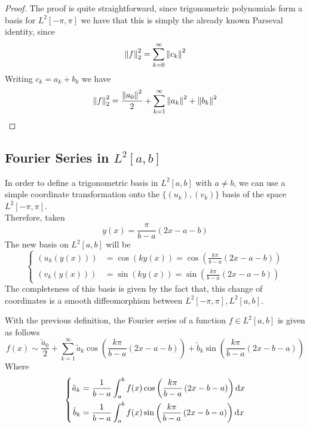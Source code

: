 \documentclass[../complete.tex]{subfiles}
\begin{document}
\begin{proof}
	The proof is quite straightforward, since trigonometric polynomials form a basis for $L^2[-\pi,\pi]$ we have that this is simply the already known Parseval identity, since
	\begin{equation*}
		\pnorm[2]{f}^2=\sum_{k=0}^{\infty}\norm{c_k}^2
	\end{equation*}
	Writing $c_k=a_k+b_k$ we have
	\begin{equation*}
		\pnorm[2]{f}^2=\frac{\norm{a_0}^2}{2}+\sum_{k=1}^{\infty}\norm{a_k}^2+\norm{b_k}^2
	\end{equation*}
\end{proof}
\subsection{Fourier Series in $L^2[a,b]$}
\begin{dfn}
	In order to define a trigonometric basis in $L^2[a,b]$ with $a\ne b$, we can use a simple coordinate transformation onto the $\{(u_k),(v_k)\}$ basis of the space $L^2[-\pi,\pi]$.\\
	Therefore, taken
	\begin{equation*}
		y(x)=\frac{\pi}{b-a}(2x-a-b)
	\end{equation*}
	The new basis on $L^2[a,b]$ will be
	\begin{equation*}
		\left\{ \begin{aligned}
				(u_k(y(x)))&=\cos(ky(x))=\cos\left(\frac{k\pi}{b-a}(2x-a-b)\right)\\
				(v_k(y(x)))&=\sin(ky(x))=\sin\left( \frac{k\pi}{b-a}\left( 2x-a-b \right) \right)
		\end{aligned}\right.
	\end{equation*}
	The completeness of this basis is given by the fact that, this change of coordinates is a smooth diffeomorphism between $L^2[-\pi,\pi],L^2[a,b]$.
\end{dfn}
\begin{dfn}
	With the previous definition, the Fourier series of a function $f\in L^2[a,b]$ is given as follows
	\begin{equation}
		f(x)\sim\frac{\tilde{a}_0}{2}+\sum_{k=1}^{\infty}\tilde{a}_k\cos\left( \frac{k\pi}{b-a}(2x-a-b) \right)+\tilde{b}_k\sin\left( \frac{k\pi}{b-a}(2x-b-a) \right)
		\label{eq:fouserab}
	\end{equation}
	Where
	\begin{equation}
		\left\{ \begin{aligned}
				\tilde{a}_k&=\frac{1}{b-a}\int_{a}^{b}f(x)\cos\left( \frac{k\pi}{b-a}\left( 2x-b-a \right) \right)\diff x\\
				\tilde{b}_k&=\frac{1}{b-a}\int_{a}^{b}f(x)\sin\left( \frac{k\pi}{b-a}\left( 2x-b-a \right) \right)\diff x
		\end{aligned}\right.
		\label{eq:fouserabcoef}
	\end{equation}
\end{dfn}
\end{document}
